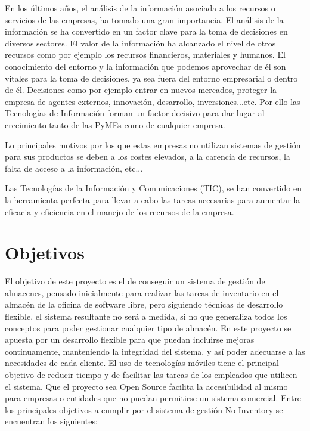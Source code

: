 \documentclass[a4paper,11pt]{book}
\begin{document}
En los últimos años, el análisis de la información asociada a los recursos o servicios de las empresas, ha tomado una gran importancia. El análisis de la información se ha convertido en un factor clave para la toma de decisiones en diversos sectores. El valor de la información ha alcanzado el nivel de otros recursos como por ejemplo los recursos financieros, materiales y humanos. El conocimiento del entorno y la información que podemos aprovechar de él son vitales para la toma de decisiones, ya sea fuera del entorno empresarial o dentro de él. Decisiones como por ejemplo entrar en nuevos mercados, proteger la empresa de agentes externos, innovación, desarrollo, inversiones...etc. Por ello las Tecnologías de Información forman un factor decisivo para dar lugar al crecimiento tanto de las PyMEs como de cualquier empresa.

Lo principales motivos por los que estas empresas no utilizan sistemas de gestión para sus productos se deben a los costes elevados, a la carencia de recursos, la falta de acceso a la información, etc... 

Las Tecnologías de la Información y Comunicaciones (TIC), se han convertido en la herramienta perfecta para llevar a cabo las tareas necesarias para aumentar 
la eficacia y eficiencia en el manejo de los recursos de la empresa.



\section{Objetivos}

El objetivo de este proyecto es el de conseguir un sistema de gestión de almacenes, pensado inicialmente para realizar las tareas de inventario en el almacén de la oficina de software libre, pero siguiendo técnicas de desarrollo flexible, el sistema resultante no será a medida, si no que generaliza todos los conceptos para poder gestionar cualquier tipo de almacén.  En este proyecto se apuesta por un desarrollo flexible para que puedan incluirse mejoras continuamente, manteniendo la integridad del sistema, y así poder adecuarse a las necesidades de cada cliente. El uso de tecnologías móviles tiene el principal objetivo de reducir tiempo y de facilitar las tareas de los empleados que utilicen el sistema. Que el proyecto sea Open Source facilita la accesibilidad al mismo para empresas o entidades que no puedan permitirse un sistema comercial. Entre los principales objetivos a cumplir por el sistema de gestión No-Inventory se encuentran los siguientes:
\end{document}
